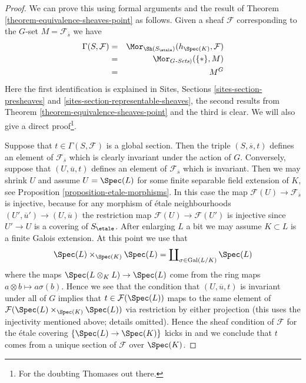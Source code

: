 \begin{proof}
We can prove this using formal arguments and the result of
Theorem \ref{theorem-equivalence-sheaves-point}
as follows. Given a sheaf $\mathcal{F}$ corresponding to
the $G$-set $M = \mathcal{F}_{\overline{s}}$ we have
\begin{eqnarray*}
\Gamma(S, \mathcal{F}) & = &
\Mor_{\Sh(S_\etale)}(h_{\Spec(K)},  \mathcal{F})
\\
& = & \Mor_{G\textit{-Sets})}(\{*\}, M) \\
& = & M^G
\end{eqnarray*}
Here the first identification is explained in
Sites, Sections \ref{sites-section-presheaves} and
\ref{sites-section-representable-sheaves},
the second results from
Theorem \ref{theorem-equivalence-sheaves-point}
and the third is clear. We will also give a direct proof\footnote{For
the doubting Thomases out there.}.

\medskip\noindent
Suppose that $t \in \Gamma(S, \mathcal{F})$ is a global section.
Then the triple $(S, \overline{s}, t)$ defines an element of
$\mathcal{F}_{\overline{s}}$ which is clearly invariant under the
action of $G$. Conversely, suppose that $(U, \overline{u}, t)$
defines an element of $\mathcal{F}_{\overline{s}}$ which is invariant.
Then we may shrink $U$ and assume $U = \Spec(L)$ for some
finite separable field extension of $K$, see
Proposition \ref{proposition-etale-morphisms}.
In this case the map $\mathcal{F}(U) \to \mathcal{F}_{\overline{s}}$
is injective, because for any morphism of \'etale neighbourhoods
$(U', \overline{u}') \to (U, \overline{u})$ the restriction map
$\mathcal{F}(U) \to \mathcal{F}(U')$ is injective since $U' \to U$
is a covering of $S_\etale$.
After enlarging $L$ a bit we may assume $K \subset L$ is a finite
Galois extension. At this point we use that
$$
\Spec(L) \times_{\Spec(K)} \Spec(L)
=
\coprod\nolimits_{\sigma \in \text{Gal}(L/K)} \Spec(L)
$$
where the maps $\Spec(L \otimes_K L) \to \Spec(L)$
come from the ring maps $a \otimes b \mapsto a\sigma(b)$. Hence we
see that the condition that $(U, \overline{u}, t)$ is invariant
under all of $G$ implies that $t \in \mathcal{F}(\Spec(L))$
maps to the same element of
$\mathcal{F}(\Spec(L) \times_{\Spec(K)} \Spec(L))$
via restriction by either projection (this uses the injectivity mentioned
above; details omitted). Hence the sheaf condition of $\mathcal{F}$
for the \'etale covering $\{\Spec(L) \to \Spec(K)\}$ kicks
in and we conclude that $t$ comes from a unique section of $\mathcal{F}$
over $\Spec(K)$.
\end{proof}

